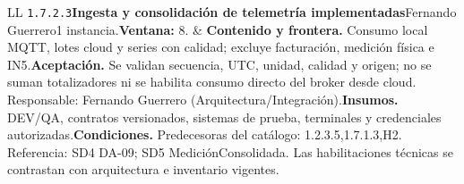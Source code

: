 \begin{longtable}{L{\tabcolsep\relax}L{\tabcolsep\relax}}
\texttt{1.\allowbreak{}7.\allowbreak{}2.\allowbreak{}3}\newline{}\textbf{Ingesta y consolidación de telemetría implementadas}\newline{}Fernando Guerrero\newline{}1 instancia.\newline{}\textbf{Ventana:} 8. & \textbf{Contenido y frontera.} Consumo local MQTT, lotes cloud y series con calidad; excluye facturación, medición física e IN5.\newline{}\textbf{Aceptación.} Se validan secuencia, UTC, unidad, calidad y origen; no se suman totalizadores ni se habilita consumo directo del broker desde cloud. Responsable: Fernando Guerrero (Arquitectura/Integración).\newline{}\textbf{Insumos.} DEV/QA, contratos versionados, sistemas de prueba, terminales y credenciales autorizadas.\newline{}\textbf{Condiciones.} Predecesoras del catálogo: 1.2.3.5,1.7.1.3,H2. Referencia: SD4 DA-09; SD5 MediciónConsolidada. Las habilitaciones técnicas se contrastan con arquitectura e inventario vigentes.\\\hline

\end{longtable}
